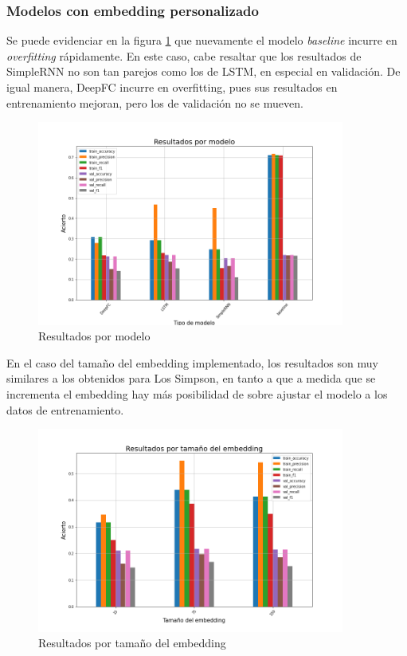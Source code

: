 \subsubsection{Modelos con embedding personalizado}

Se puede evidenciar en la figura \ref{fig:fri_deep_model} que nuevamente el modelo \textit{baseline} incurre en \textit{overfitting} rápidamente. En este caso, cabe resaltar que los resultados de SimpleRNN no son tan parejos como los de LSTM, en especial en validación. De igual manera, DeepFC incurre en overfitting, pues sus resultados en entrenamiento mejoran, pero los de validación no se mueven.\\

\begin{figure}[H]
    \centering
    \includegraphics[width=0.9\textwidth]{results/friends/deepModels/sim_res_deep_model.png}
    \caption{Resultados por modelo}
    \label{fig:fri_deep_model}
\end{figure}

En el caso del tamaño del embedding implementado, los resultados son muy similares a los obtenidos para Los Simpson, en tanto a que a medida que se incrementa el embedding hay más posibilidad de sobre ajustar el modelo a los datos de entrenamiento.\\

\begin{figure}[H]
    \centering
    \includegraphics[width=0.9\textwidth]{results/friends/deepModels/sim_res_deep_em_size.png}
    \caption{Resultados por tamaño del embedding}
    \label{fig:fri_deep_em_size}
\end{figure}

